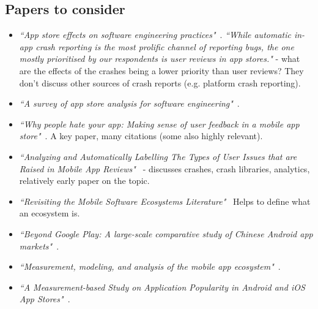 \subsection{Papers to consider}
\begin{itemize}
    \item \emph{``App store effects on software engineering practices"}~\citep{alsubaihin2019app_store_effects_on_software_engineering}. \emph{``While automatic in-app crash reporting is the most prolific channel of reporting bugs, the one mostly prioritised by our respondents is user reviews in app stores."} - what are the effects of the crashes being a lower priority than user reviews? They don't discuss other sources of crash reports (e.g. platform crash reporting).
    
    \item \emph{``A survey of app store analysis for software engineering"}~\cite{martin2016survey, martin2017_survey_in_app_store_analysis_for_software_engineering_IEEE_edition}.
    
    \item \emph{``Why people hate your app: Making sense of user feedback in a mobile app store"}~\cite{fu2013people}. A key paper, many citations (some also highly relevant).
    
    \item \emph{``Analyzing and Automatically Labelling The Types of User Issues that are Raised in Mobile App Reviews"}~\cite{mcilroy2016_analyzing_and_automatically_labelling_the_types_of_user_issues_raised_in_mobile_app_reviews} - discusses crashes, crash libraries, analytics, relatively early paper on the topic.
    
    \item \emph{``Revisiting the Mobile Software Ecosystems Literature"}~\cite{steglich2019_revisiting_the_mobile_app_ecosystem} Helps to define what an ecosystem is.
    
    \item \emph{``Beyond Google Play: A large-scale comparative study of Chinese Android app markets"}~\cite{wang2018_beyond_google_play}.
    
    \item \emph{``Measurement, modeling, and analysis of the mobile app ecosystem"}~\cite{petsas2017measurement}.
    
    \item \emph{``A Measurement-based Study on Application Popularity in Android and iOS App Stores"}~\cite{liu2015measurement}.
    

\end{itemize}
